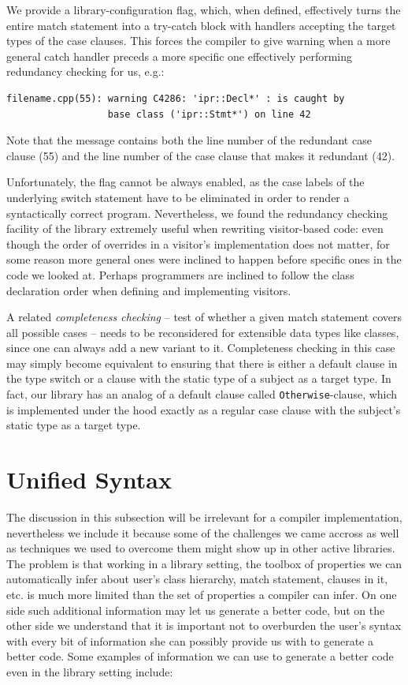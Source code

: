 \documentclass[preprint]{sigplanconf}
\makeatletter
\DeclareRobustCommand{\code}[1]{{\lstinline[breaklines=false,escapechar=@]{#1}}}
\makeatother
\begin{document}
We provide a library-configuration flag, which, when defined, effectively turns 
the entire match statement into a try-catch block with handlers accepting the 
target types of the case clauses. This forces the compiler to give warning when 
a more general catch handler preceds a more specific one effectively performing 
redundancy checking for us, e.g.:

\begin{lstlisting}
filename.cpp(55): warning C4286: 'ipr::Decl*' : is caught by 
                  base class ('ipr::Stmt*') on line 42
\end{lstlisting}

\noindent
Note that the message contains both the line number of the redundant case clause (55) 
and the line number of the case clause that makes it redundant (42).

Unfortunately, the flag cannot be always enabled, as the case labels of the underlying 
switch statement have to be eliminated in order to render a syntactically 
correct program. Nevertheless, we found the redundancy checking facility of the 
library extremely useful when rewriting visitor-based code: even though the 
order of overrides in a visitor's implementation does not matter, for some reason 
more general ones were inclined to happen before specific ones in the code we 
looked at. Perhaps programmers are inclined to follow the class declaration order when 
defining and implementing visitors.

A related \emph{completeness checking} -- test of whether a given match 
statement covers all possible cases -- needs to be reconsidered for extensible 
data types like classes, since one can always add a new variant to it. 
Completeness checking in this case may simply become equivalent to ensuring that 
there is either a default clause in the type switch or a clause with the static type 
of a subject as a target type. In fact, our library has an analog of a default 
clause called \code{Otherwise}-clause, which is implemented under the hood 
exactly as a regular case clause with the subject's static type as a target type.

\section{Unified Syntax}
\label{sec:unisyn}

The discussion in this subsection will be irrelevant for a compiler 
implementation, nevertheless we include it because some of the challenges we 
came accross as well as techniques we used to overcome them might show up in 
other active libraries. The problem is that working in a library setting, the 
toolbox of properties we can automatically infer about user's class hierarchy, 
match statement, clauses in it, etc. is much more limited than the set of 
properties a compiler can infer. On one side such additional information may let 
us generate a better code, but on the other side we understand that it is 
important not to overburden the user's syntax with every bit of information she 
can possibly provide us with to generate a better code. Some examples of 
information we can use to generate a better code even in the library setting 
include:
\end{document}
